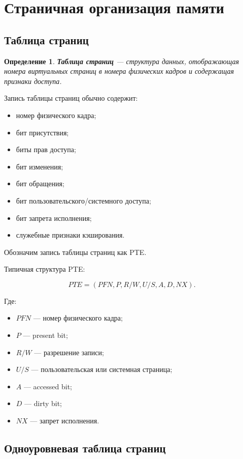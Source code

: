 \documentclass[a4paper,12pt]{article}
\newtheorem{definition}{Определение}
\begin{document}
\section{Страничная организация памяти}

\subsection{Таблица страниц}

\begin{definition}
\textbf{Таблица страниц} --- структура данных, отображающая номера виртуальных страниц в номера физических кадров и содержащая признаки доступа.
\end{definition}

Запись таблицы страниц обычно содержит:

\begin{itemize}
    \item номер физического кадра;
    \item бит присутствия;
    \item биты прав доступа;
    \item бит изменения;
    \item бит обращения;
    \item бит пользовательского/системного доступа;
    \item бит запрета исполнения;
    \item служебные признаки кэширования.
\end{itemize}

Обозначим запись таблицы страниц как PTE.

Типичная структура PTE:

\[
PTE = (PFN, P, R/W, U/S, A, D, NX).
\]

Где:

\begin{itemize}
    \item $PFN$ --- номер физического кадра;
    \item $P$ --- present bit;
    \item $R/W$ --- разрешение записи;
    \item $U/S$ --- пользовательская или системная страница;
    \item $A$ --- accessed bit;
    \item $D$ --- dirty bit;
    \item $NX$ --- запрет исполнения.
\end{itemize}

\subsection{Одноуровневая таблица страниц}
\end{document}

